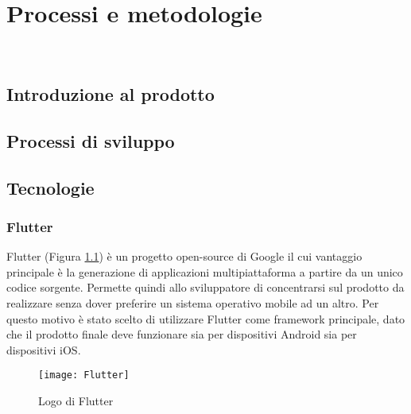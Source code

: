\chapter{Processi e metodologie}
\label{cap:processi-metodologie}

\\

\section{Introduzione al prodotto}

\section{Processi di sviluppo}

\section{Tecnologie}

\subsection{Flutter}
Flutter (Figura \ref{fig:flutter}) è un progetto open-source di Google il cui vantaggio principale è la generazione di applicazioni multipiattaforma a partire da un unico codice sorgente.\newline
Permette quindi allo sviluppatore di concentrarsi sul prodotto da realizzare senza dover preferire un sistema operativo mobile ad un altro.\newline
Per questo motivo è stato scelto di utilizzare Flutter come framework principale, dato che il prodotto finale deve funzionare sia per dispositivi Android sia per dispositivi iOS.\newline
\begin{figure}[!h] 
    \centering 
    \texttt{[image: Flutter]} 
    \caption{Logo di Flutter}\label{fig:flutter}
\end{figure}

